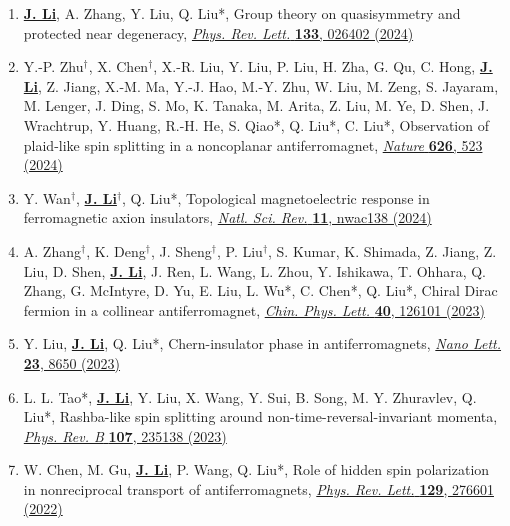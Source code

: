 \documentclass[a4paper,11pt]{article}
\begin{document}
\begin{enumerate}[leftmargin=*]
    \item \underline{\textbf{J. Li}}, A. Zhang, Y. Liu, Q. Liu*, Group theory on quasisymmetry and protected near degeneracy, \href{https://doi.org/10.1103/PhysRevLett.133.026402}{\textit{Phys. Rev. Lett.} \textbf{133}, 026402 (2024)}

    \item Y.-P. Zhu$^{\dagger}$, X. Chen$^{\dagger}$, X.-R. Liu, Y. Liu, P. Liu, H. Zha, G. Qu, C. Hong, \underline{\textbf{J. Li}}, Z. Jiang, X.-M. Ma, Y.-J. Hao, M.-Y. Zhu, W. Liu, M. Zeng, S. Jayaram, M. Lenger, J. Ding, S. Mo, K. Tanaka, M. Arita, Z. Liu, M. Ye, D. Shen, J. Wrachtrup, Y. Huang, R.-H. He, S. Qiao*, Q. Liu*, C. Liu*, Observation of plaid-like spin splitting in a noncoplanar antiferromagnet, \href{https://doi.org/10.1038/s41586-024-07023-w}{\textit{Nature} \textbf{626}, 523 (2024)}

    \item Y. Wan$^{\dagger}$, \underline{\textbf{J. Li}}$^{\dagger}$, Q. Liu*, Topological magnetoelectric response in ferromagnetic axion insulators, \href{https://doi.org/10.1093/nsr/nwac138}{\textit{Natl. Sci. Rev.} \textbf{11}, nwac138 (2024)}

    \item A. Zhang$^{\dagger}$, K. Deng$^{\dagger}$, J. Sheng$^{\dagger}$, P. Liu$^{\dagger}$, S. Kumar, K. Shimada, Z. Jiang, Z. Liu, D. Shen, \underline{\textbf{J. Li}}, J. Ren, L. Wang, L. Zhou, Y. Ishikawa, T. Ohhara, Q. Zhang, G. McIntyre, D. Yu, E. Liu, L. Wu*, C. Chen*, Q. Liu*, Chiral Dirac fermion in a collinear antiferromagnet, \href{https://doi.org/10.1088/0256-307X/40/12/126101}{\textit{Chin. Phys. Lett.} \textbf{40}, 126101 (2023)}

    \item Y. Liu, \underline{\textbf{J. Li}}, Q. Liu*, Chern-insulator phase in antiferromagnets, \href{https://doi.org/10.1021/acs.nanolett.3c02489}{\textit{Nano Lett.} \textbf{23}, 8650 (2023)}

    \item L. L. Tao*, \underline{\textbf{J. Li}}, Y. Liu, X. Wang, Y. Sui, B. Song, M. Y. Zhuravlev, Q. Liu*, Rashba-like spin splitting around non-time-reversal-invariant momenta, \href{https://doi.org/10.1103/PhysRevB.107.235138}{\textit{Phys. Rev. B} \textbf{107}, 235138 (2023)}

    \item W. Chen, M. Gu, \underline{\textbf{J. Li}}, P. Wang, Q. Liu*, Role of hidden spin polarization in nonreciprocal transport of antiferromagnets, \href{https://doi.org/10.1103/PhysRevLett.129.276601}{\textit{Phys. Rev. Lett.} \textbf{129}, 276601 (2022)}


\end{enumerate}
\end{document}
